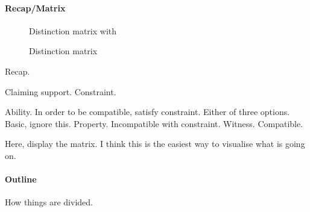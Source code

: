 \paragraph{Recap/Matrix}

\begin{note}
  \begin{figure}[H]
    \centering
    \saMtxInterpreted{}
    \caption{Distinction matrix with }
    \label{fig:saMtxInterpreted:outline}
  \end{figure}
\end{note}

\begin{note}
  \begin{figure}[H]
    \centering
    \saMtxRuledOut{}
    \caption{Distinction matrix}
    \label{fig:saMtxRuledOut:outline}
  \end{figure}
\end{note}

\begin{note}
  Recap.

  Claiming support.
  Constraint.

  Ability.
  In order to be compatible, satisfy constraint.
  Either of three options.
  Basic, ignore this.
  Property. Incompatible with constraint.
  Witness. Compatible.

  Here, display the matrix.
  I think this is the easiest way to visualise what is going on.
\end{note}

\paragraph{Outline}

\begin{note}
  How things are divided.
\end{note}

